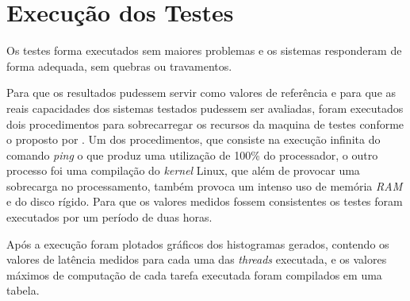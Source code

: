 \section{Execução dos Testes}
Os testes forma executados sem maiores problemas e os sistemas responderam de forma adequada, sem quebras ou travamentos.

Para que os resultados pudessem servir como valores de referência e para que as reais capacidades dos sistemas testados pudessem ser avaliadas, foram executados dois procedimentos para sobrecarregar os recursos da maquina de testes conforme o proposto por \cite{Lim2017}. Um dos procedimentos, que consiste na execução infinita do comando \textit{ping} o que produz uma utilização de 100\% do processador, o outro processo foi uma compilação do \textit{kernel} Linux, que além de provocar uma sobrecarga no processamento, também provoca um intenso uso de memória \textit{RAM} e do disco rígido. Para que os valores medidos fossem consistentes os testes foram executados por um período de duas horas.

Após a execução foram plotados gráficos dos histogramas gerados, contendo os valores de latência medidos para cada uma das \textit{threads} executada, e os valores máximos de computação de cada tarefa executada foram compilados em uma tabela.  